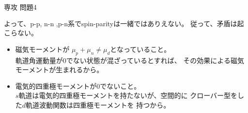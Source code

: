 \documentclass[fleqn]{jbook}
\begin{document}
\begin{answer}{専攻 問題4}{}
\begin{subanswers}
\begin{subsubanswers}
    よって、p-p, n-n ,p-n系でspin-parityは一緒ではありえない。
    従って、矛盾は起こらない。

  \SubSubAnswer
    \begin{itemize}
    \item 磁気モーメントが $\mu_{p}+\mu_n\neq\mu_d$となっていること。\\
          軌道角運動量が$0$でない状態が混ざっているとすれば、
          その効果による磁気モーメントが生まれるから。

    \item 電気的四重極モーメントが0でないこと。\\
	  $s$軌道は電気的四重極モーメントを持たないが、空間的に
          クローバー型をした$d$軌道波動関数は四重極モーメントを
          持つから。
    \end{itemize}


\end{subsubanswers}
\end{subanswers}
\end{answer}
\end{document}
